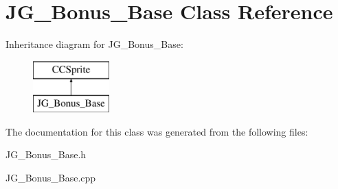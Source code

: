 \hypertarget{class_j_g___bonus___base}{\section{J\-G\-\_\-\-Bonus\-\_\-\-Base Class Reference}
\label{class_j_g___bonus___base}
}
Inheritance diagram for J\-G\-\_\-\-Bonus\-\_\-\-Base\-:\begin{figure}[H]
\begin{center}
\leavevmode
\includegraphics[height=2.000000cm]{class_j_g___bonus___base}
\end{center}
\end{figure}


The documentation for this class was generated from the following files\-:\begin{DoxyCompactItemize}
\item 
J\-G\-\_\-\-Bonus\-\_\-\-Base.\-h\item 
J\-G\-\_\-\-Bonus\-\_\-\-Base.\-cpp\end{DoxyCompactItemize}
